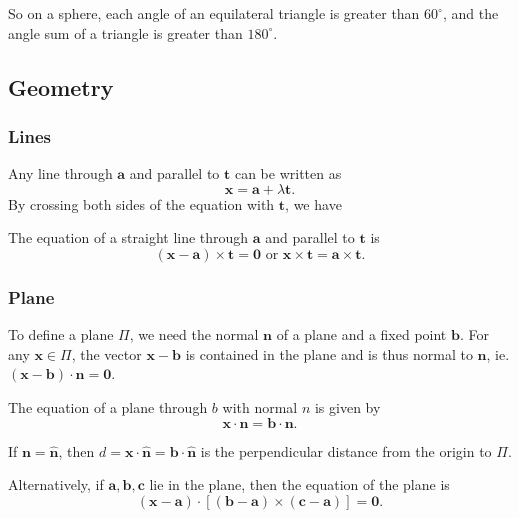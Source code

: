 \documentclass[a4paper]{article}
\begin{document}
So on a sphere, each angle of an equilateral triangle is greater than $60^\circ$, and the angle sum of a triangle is greater than $180^\circ$.

\subsection{Geometry}
\subsubsection{Lines}
Any line through $\mathbf{a}$ and parallel to $\mathbf{t}$ can be written as
\[
  \mathbf{x} = \mathbf{a} + \lambda\mathbf{t}.
\]
By crossing both sides of the equation with $\mathbf{t}$, we have
\begin{thm} The equation of a straight line through $\mathbf{a}$ and parallel to $\mathbf{t}$ is
  \[
    \mathbf{(x - a)\times t = 0}\text{ or }\mathbf{x\times t = a\times t}.
  \]
\end{thm}
\subsubsection{Plane}
To define a plane $\Pi$, we need the normal $\mathbf{n}$ of a plane and a fixed point $\mathbf{b}$.  For any $\mathbf{x}\in \Pi$, the vector $\mathbf{x - b}$ is contained in the plane and is thus normal to $\mathbf{n}$, ie. $\mathbf{(x - b)\cdot n = 0}$.
\begin{thm}
  The equation of a plane through $b$ with normal $n$ is given by
  \[
    \mathbf{x\cdot n = b\cdot n}.
  \]
\end{thm}
If $\mathbf{n = \hat n}$, then $d = \mathbf{x\cdot\hat{n} = b\cdot\hat{n}}$ is the perpendicular distance from the origin to $\Pi$.

Alternatively, if $\mathbf{a, b, c}$ lie in the plane, then the equation of the plane is
\[
  \mathbf{(x - a)\cdot [(b - a)\times (c - a)] = 0}.
\]
\end{document}
